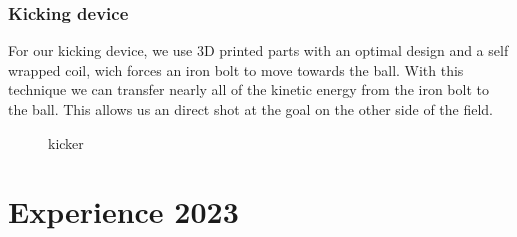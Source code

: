 \documentclass{scrartcl}
\begin{document}
\subsubsection{Kicking device}
For our kicking device, we use 3D printed parts with an optimal design and a self wrapped coil, wich forces an iron bolt to move towards the ball.
With this technique we can transfer nearly all of the kinetic energy from the iron bolt to the ball. This allows us an direct
shot at the goal on the other side of the field.

\begin{figure}[!h]
    \begin{center}
    \caption{kicker}
    \label{kicker}
    \end{center}
    \end{figure}

\section{Experience 2023}
\end{document}
